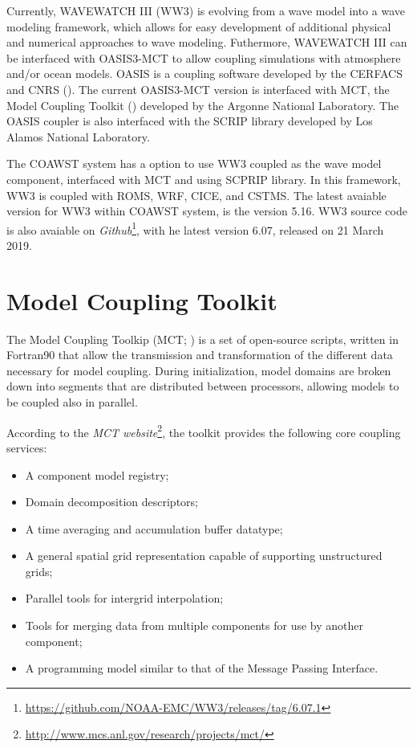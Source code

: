 \noindent Currently,  WAVEWATCH III (WW3) is evolving from a wave model into a wave modeling framework, which allows for easy development of additional 
physical and numerical approaches to wave modeling. Futhermore,  WAVEWATCH III can be interfaced with OASIS3-MCT to allow coupling simulations with 
atmosphere and/or ocean models. OASIS is a coupling software developed by the CERFACS and CNRS (\cite{Valcke2013}). The current OASIS3-MCT version is 
interfaced with MCT, the Model Coupling Toolkit (\cite{Larson2005}) developed by the Argonne National Laboratory. The OASIS coupler is also interfaced 
with the SCRIP library developed by Los Alamos National Laboratory. 
\bigskip

\noindent The COAWST system has a option to use WW3 coupled as the wave model component, interfaced with MCT and using SCPRIP library. In this framework, WW3 is 
coupled with ROMS, WRF, CICE, and CSTMS. The latest avaiable version for WW3 within COAWST system, 
is the version 5.16. WW3 source code is also avaiable on \textcolor{bleu_cite}{\textit{Github}\footnote{\textcolor{bleu_cite}{\href{https://github.com/NOAA-EMC/WW3/releases/tag/6.07.1}{https://github.com/NOAA-EMC/WW3/releases/tag/6.07.1}}}}, with he latest 
version 6.07, released on 21 March 2019.


\section{Model Coupling Toolkit}\label{mctsecao}
\bigskip

\noindent  The Model Coupling Toolkip (MCT; \cite{Larson2005, Jacob2005, Warner2008}) is a set of open-source scripts, written in Fortran90 that allow the transmission 
and transformation of the different data necessary for model coupling. During initialization, model domains are broken down into segments that are distributed
between processors, allowing models to be coupled also in parallel.
\bigskip

\noindent According to the \textcolor{bleu_cite}{\textit{MCT website}\footnote{\textcolor{bleu_cite}{\href{http://www.mcs.anl.gov/research/projects/mct/}{http://www.mcs.anl.gov/research/projects/mct/}}}}, 
the toolkit provides the following core coupling services:
\bigskip

\begin{itemize}
\item A component model registry;
\item Domain decomposition descriptors;
\item A time averaging and accumulation buffer datatype;
\item A general spatial grid representation capable of supporting unstructured grids;
\item Parallel tools for intergrid interpolation;
\item Tools for merging data from multiple components for use by another component;
\item A programming model similar to that of the Message Passing Interface. 
\end{itemize}
\bigskip

